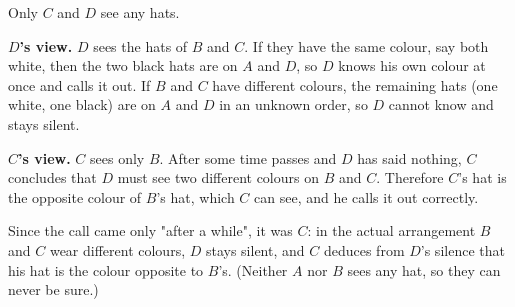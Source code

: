 Only $C$ and $D$ see any hats.

\textbf{$D$'s view.} $D$ sees the hats of $B$ and $C$. If they have the same colour, say both white, then the two black hats are on $A$ and $D$, so $D$ knows his own colour at once and calls it out. If $B$ and $C$ have different colours, the remaining hats (one white, one black) are on $A$ and $D$ in an unknown order, so $D$ cannot know and stays silent.

\textbf{$C$'s view.} $C$ sees only $B$. After some time passes and $D$ has said nothing, $C$ concludes that $D$ must see two different colours on $B$ and $C$. Therefore $C$'s hat is the opposite colour of $B$'s hat, which $C$ can see, and he calls it out correctly.

Since the call came only "after a while", it was $\boxed{C}$: in the actual arrangement $B$ and $C$ wear different colours, $D$ stays silent, and $C$ deduces from $D$'s silence that his hat is the colour opposite to $B$'s. (Neither $A$ nor $B$ sees any hat, so they can never be sure.)
